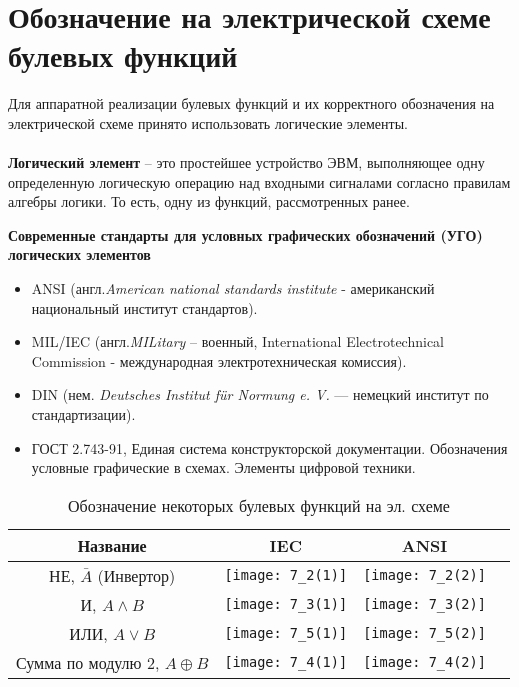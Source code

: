 \section{Обозначение на электрической схеме булевых функций}
Для аппаратной реализации булевых функций и их корректного обозначения на электрической схеме принято использовать логические элементы.
\\
\\\textbf{Логический элемент} – это простейшее устройство ЭВМ, выполняющее одну определенную логическую операцию над входными сигналами согласно правилам алгебры логики. То есть, одну из функций, рассмотренных ранее.
\begin{center}
  \textbf{Современные стандарты для условных графических обозначений (УГО) логических элементов}
\end{center}
\begin{itemize}
  \item ANSI (англ.\emph{American national standards institute} - американский национальный институт стандартов).
  \item MIL/IEC (англ.\emph{MILitary} – военный, {International Electrotechnical Commission} - международная электротехническая комиссия).
  \item DIN (нем. \emph{Deutsches Institut f{\"u}r Normung e. V.} — немецкий институт по стандартизации).
  \item ГОСТ 2.743-91, Единая система конструкторской документации. Обозначения условные графические в схемах. Элементы цифровой техники. 
\end{itemize}
\begin{table}[!h]
\centering
\begin{tabular}{|c|c|c|c|}
\hline
Название & IEC & ANSI \\
\hline
\multirow{3}{*}{НЕ, $\bar{A}$ (Инвертор)} & \multirow{3}{*}{\texttt{[image: 7\_2(1)]}} & \multirow{3}{*}{\texttt{[image: 7\_2(2)]}} \\
& & \\
& & \\
\hline
\multirow{3}{*}{И, $A \wedge B$} & \multirow{3}{*}{\texttt{[image: 7\_3(1)]}} & \multirow{3}{*}{\texttt{[image: 7\_3(2)]}} \\
& & \\
& & \\
\hline
\multirow{3}{*}{ИЛИ, $A \vee B$} & \multirow{3}{*}{\texttt{[image: 7\_5(1)]}} & \multirow{3}{*}{\texttt{[image: 7\_5(2)]}} \\
& & \\
& & \\
\hline
\multirow{3}{*}{Сумма по модулю 2, $A \oplus B$} & \multirow{3}{*}{\texttt{[image: 7\_4(1)]}} & \multirow{3}{*}{\texttt{[image: 7\_4(2)]}} \\
& & \\
& & \\
\hline
\end{tabular}
\caption{Обозначение некоторых булевых функций на эл. схеме}
\end{table}
